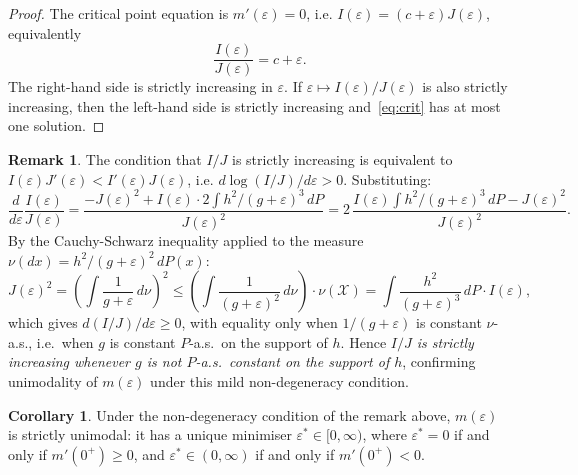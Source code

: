 \documentclass[11pt,reqno]{amsart}
\theoremstyle{definition}
\newtheorem{cor}[thm]{Corollary}
\newtheorem{rem}[thm]{Remark}
\begin{document}
\begin{proof}
The critical point equation is $m'(\varepsilon)=0$, i.e.
$I(\varepsilon) = (c+\varepsilon)J(\varepsilon)$, equivalently
\begin{equation}\label{eq:crit}
  \frac{I(\varepsilon)}{J(\varepsilon)} = c + \varepsilon.
\end{equation}
The right-hand side is strictly increasing in $\varepsilon$. If
$\varepsilon\mapsto I(\varepsilon)/J(\varepsilon)$ is also strictly increasing,
then the left-hand side is strictly increasing and~\eqref{eq:crit} has at
most one solution.
\end{proof}

\begin{rem}
The condition that $I/J$ is strictly increasing is equivalent to
$I(\varepsilon)J'(\varepsilon) < I'(\varepsilon)J(\varepsilon)$, i.e.
$d\log(I/J)/d\varepsilon > 0$. Substituting:
\[
  \frac{d}{d\varepsilon}\frac{I(\varepsilon)}{J(\varepsilon)}
  = \frac{-J(\varepsilon)^2 + I(\varepsilon)\cdot 2\int h^2/(g+\varepsilon)^3\,dP}
         {J(\varepsilon)^2}
  = 2\,\frac{I(\varepsilon)\int h^2/(g+\varepsilon)^3\,dP - J(\varepsilon)^2}
            {J(\varepsilon)^2}.
\]
By the Cauchy-Schwarz inequality applied to the measure $\nu(dx) = h^2/(g+\varepsilon)^2\,dP(x)$:
\[
  J(\varepsilon)^2
  = \left(\int \frac{1}{g+\varepsilon}\,d\nu\right)^2
  \leq \left(\int \frac{1}{(g+\varepsilon)^2}\,d\nu\right)\cdot\nu(\mathcal{X})
  = \int\frac{h^2}{(g+\varepsilon)^3}\,dP \cdot I(\varepsilon),
\]
which gives $d(I/J)/d\varepsilon \geq 0$, with equality only when
$1/(g+\varepsilon)$ is constant $\nu$-a.s., i.e.\ when $g$ is constant
$P$-a.s.\ on the support of $h$. Hence \emph{$I/J$ is strictly increasing
whenever $g$ is not $P$-a.s.\ constant on the support of $h$}, confirming
unimodality of $m(\varepsilon)$ under this mild non-degeneracy condition.
\end{rem}

\begin{cor}
Under the non-degeneracy condition of the remark above, $m(\varepsilon)$ is
strictly unimodal: it has a unique minimiser $\varepsilon^*\in[0,\infty)$,
where $\varepsilon^*=0$ if and only if $m'(0^+)\geq 0$, and
$\varepsilon^*\in(0,\infty)$ if and only if $m'(0^+)<0$.
\end{cor}
\end{document}
